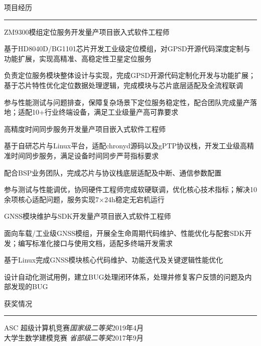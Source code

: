 \documentclass{cv}
\renewenvironment{rSection}[1]{
\sectionskip
\textcolor{RoyalPurple}{\MakeUppercase{#1}}
\sectionlineskip
\hrule
\begin{list}{}{
\setlength{\leftmargin}{1.5em}
}
\item[]
}{
\end{list}
}
\begin{document}
\begin{rSection}{项目经历}
	\begin{rSubsection}{ZM9300模组定位服务开发}{量产项目}{嵌入式软件工程师}{}
		\item 基于HD8040D/BG1101芯片开发工业级定位模组，对GPSD开源代码深度定制与功能扩展，实现高精准、高稳定性卫星定位服务
		\item 负责定位服务模块整体设计与实现，完成GPSD开源代码定制化开发与功能扩展；基于芯片特性优化定位数据处理逻辑，完成模块与芯片底层适配及全流程联调
		\item 参与性能测试与问题排查，保障复杂场景下定位服务稳定性，配合团队完成量产落地；适配10+行业终端设备，满足工业级量产高可靠要求
	\end{rSubsection}

	\vfill
	\newpage

	\begin{rSubsection}{高精度时间同步服务开发}{量产项目}{嵌入式软件工程师}{}
		\item 基于自研芯片与Linux平台，适配chronyd源码以及gPTP协议栈，开发工业级高精准时间同步服务，满足设备时间同步严苛指标要求
		\item 配合BSP业务团队，完成芯片与协议栈底层适配及中断、通信参数配置
		\item 参与测试与性能调优，协同硬件工程师完成软硬联调，优化核心技术指标；解决10余项核心适配问题，服务实现7×24h稳定无宕机运行
	\end{rSubsection}

	\begin{rSubsection}{GNSS模块维护与SDK开发}{量产项目}{嵌入式软件工程师}{}
		\item 面向车载/工业级GNSS模组，开展全生命周期代码维护、性能优化与配套SDK开发；编写标准化接口与使用文档，适配多终端开发需求
		\item 基于Linux完成GNSS模块核心代码维护、功能迭代及关键逻辑性能优化
		\item 设计自动化测试用例，建立BUG处理闭环体系，处理并修复客户反馈的问题及内部发现的BUG
	\end{rSubsection}
\end{rSection}

\begin{rSection}{获奖情况} \itemsep -2pt
	{ASC 超级计算机竞赛}\hfill {\em 国家级二等奖}\hfill {2019年4月} \\
	{大学生数学建模竞赛}\hfill {\em {} 省部级二等奖}\hfill {2017年9月}
\end{rSection}
\end{document}
